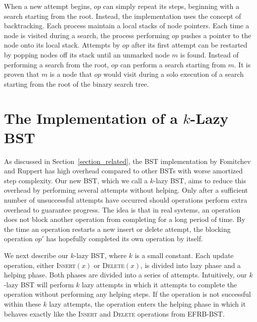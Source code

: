 \documentclass[letterpaper,twocolumn]{article}
\begin{document}
When a new attempt begins, $op$ can simply repeat its steps, beginning with a search starting from the root. Instead, the implementation uses the concept of backtracking. Each process maintain a local stacks of node pointers. Each time a node is visited during a search, the process performing $op$ pushes a pointer to the node onto its local stack. Attempts by $op$ after its first attempt can be restarted by popping nodes off its stack until an unmarked node $m$ is found. Instead of performing a search from the root, $op$ can perform a search starting from $m$. It is proven that $m$ is a node that $op$ would visit during a solo execution of a search starting from the root of the binary search tree.


\section{The Implementation of a $k$-Lazy BST}\label{section_implementation}
As discussed in Section~\ref{section_related}, the BST implementation by Fomitchev and Ruppert has high overhead compared to other BSTs with worse amortized step complexity. Our new BST, which we call a $k$-lazy BST, aims to reduce this overhead by performing several attempts without helping. Only after a sufficient number of unsuccessful attempts have occurred should operations perform extra overhead to guarantee progress. The idea is that in real systems, an operation does not block another operation from completing for a long period of time. By the time an operation restarts a new insert or delete attempt, the blocking operation $op'$ has hopefully completed its own operation by itself. 

We next describe our $k$-lazy BST, where $k$ is a small constant. Each update operation, either \textsc{Insert}$(x)$ or \textsc{Delete}$(x)$, is divided into lazy phase and a helping phase. Both phases are divided into a series of attempts. Intuitively, our $k$-lazy BST will perform $k$ lazy attempts in which it attempts to complete the operation without performing any helping steps. If the operation is not successful within these $k$ lazy attempts, the operation enters the helping phase in which it behaves exactly like the \textsc{Insert} and \textsc{Delete} operations from EFRB-BST.
\end{document}
